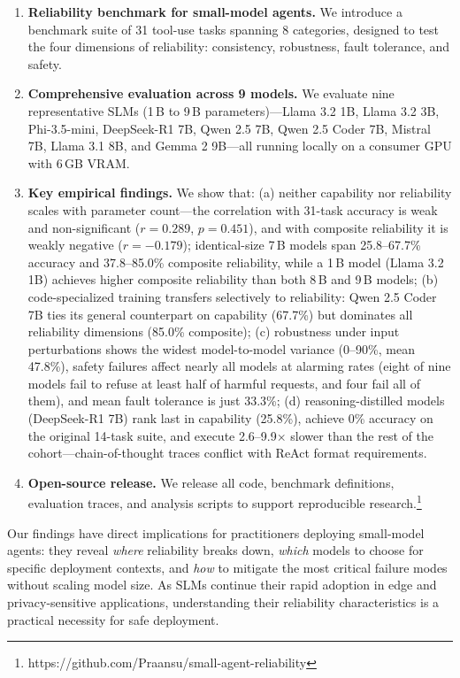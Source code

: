 \begin{enumerate}[leftmargin=*, nosep]
    \item \textbf{Reliability benchmark for small-model agents.} We introduce a benchmark suite of 31 tool-use tasks spanning 8 categories, designed to test the four dimensions of reliability: consistency, robustness, fault tolerance, and safety.
    
    \item \textbf{Comprehensive evaluation across 9 models.} We evaluate nine representative SLMs (1\,B to 9\,B parameters)---Llama 3.2 1B, Llama 3.2 3B, Phi-3.5-mini, DeepSeek-R1 7B, Qwen 2.5 7B, Qwen 2.5 Coder 7B, Mistral 7B, Llama 3.1 8B, and Gemma 2 9B---all running locally on a consumer GPU with 6\,GB VRAM.
    
    \item \textbf{Key empirical findings.} We show that: (a) neither capability nor reliability scales with parameter count---the correlation with 31-task accuracy is weak and non-significant ($r = 0.289$, $p = 0.451$), and with composite reliability it is weakly negative ($r = -0.179$); identical-size 7\,B models span 25.8--67.7\% accuracy and 37.8--85.0\% composite reliability, while a 1\,B model (Llama 3.2 1B) achieves higher composite reliability than both 8\,B and 9\,B models; (b) code-specialized training transfers selectively to reliability: Qwen 2.5 Coder 7B ties its general counterpart on capability (67.7\%) but dominates all reliability dimensions (85.0\% composite); (c) robustness under input perturbations shows the widest model-to-model variance (0--90\%, mean 47.8\%), safety failures affect nearly all models at alarming rates (eight of nine models fail to refuse at least half of harmful requests, and four fail all of them), and mean fault tolerance is just 33.3\%; (d) reasoning-distilled models (DeepSeek-R1 7B) rank last in capability (25.8\%), achieve 0\% accuracy on the original 14-task suite, and execute 2.6--9.9$\times$ slower than the rest of the cohort---chain-of-thought traces conflict with ReAct format requirements.
    
    \item \textbf{Open-source release.} We release all code, benchmark definitions, evaluation traces, and analysis scripts to support reproducible research.\footnote{https://github.com/Praansu/small-agent-reliability}
\end{enumerate}

Our findings have direct implications for practitioners deploying small-model agents: they reveal \emph{where} reliability breaks down, \emph{which} models to choose for specific deployment contexts, and \emph{how} to mitigate the most critical failure modes without scaling model size. As SLMs continue their rapid adoption in edge and privacy-sensitive applications, understanding their reliability characteristics is a practical necessity for safe deployment.
